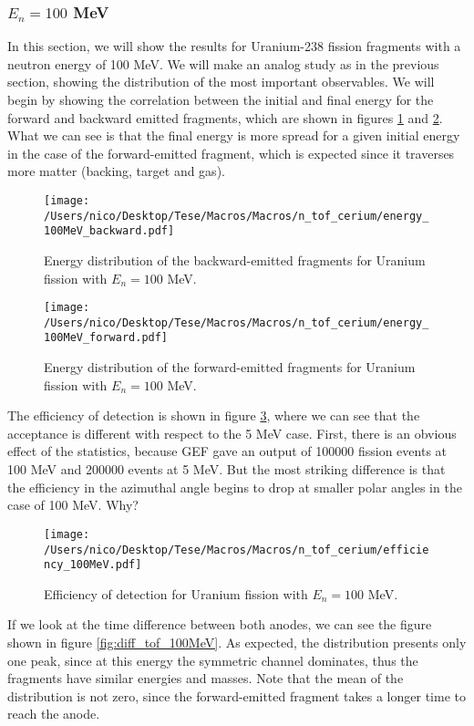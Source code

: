 \documentclass{article}
\begin{document}
\subsubsection*{$E_n=100$ MeV}
In this section, we will show the results for Uranium-238 fission fragments with a neutron energy of 100 MeV. We will make an analog study as in the previous section, showing the distribution of the most important observables.
We will begin by showing the correlation between the initial and final energy for the forward and backward emitted fragments, which are shown in figures \ref{fig:energy_100MeV_back} and \ref{fig:energy_100MeV_forw}. What we can see is that the final energy is more spread for a given initial energy in the case of the forward-emitted fragment, which is expected since it traverses more matter (backing, target and gas).
\begin{figure}[H]
    \centering
    \texttt{[image: /Users/nico/Desktop/Tese/Macros/Macros/n\_tof\_cerium/energy\_100MeV\_backward.pdf]}
    \caption{Energy distribution of the backward-emitted fragments for Uranium fission with $E_n=100$ MeV.}
    \label{fig:energy_100MeV_back}
\end{figure}
\begin{figure}[H]
    \centering
    \texttt{[image: /Users/nico/Desktop/Tese/Macros/Macros/n\_tof\_cerium/energy\_100MeV\_forward.pdf]}
    \caption{Energy distribution of the forward-emitted fragments for Uranium fission with $E_n=100$ MeV.}
    \label{fig:energy_100MeV_forw}
\end{figure}
The efficiency of detection is shown in figure \ref{fig:eff_100MeV}, where we can see that the acceptance is different with respect to the 5 MeV case. First, there is an obvious effect of the statistics, because GEF gave an output of 100000 fission events at 100 MeV and 200000 events at 5 MeV. But the most striking difference is that the efficiency in the azimuthal angle begins to drop at smaller polar angles in the case of 100 MeV. Why?

\begin{figure}[H]
    \centering   
    \texttt{[image: /Users/nico/Desktop/Tese/Macros/Macros/n\_tof\_cerium/efficiency\_100MeV.pdf]}
    \caption{Efficiency of detection for Uranium fission with $E_n=100$ MeV.}
    \label{fig:eff_100MeV}
\end{figure}
If we look at the time difference between both anodes, we can see the figure shown in figure \ref{fig:diff_tof_100MeV}. As expected, the distribution presents only one peak, since at this energy the symmetric channel dominates, thus the fragments have similar energies and masses. Note that the mean of the distribution is not zero, since the forward-emitted fragment takes a longer time to reach the anode.
\end{document}
